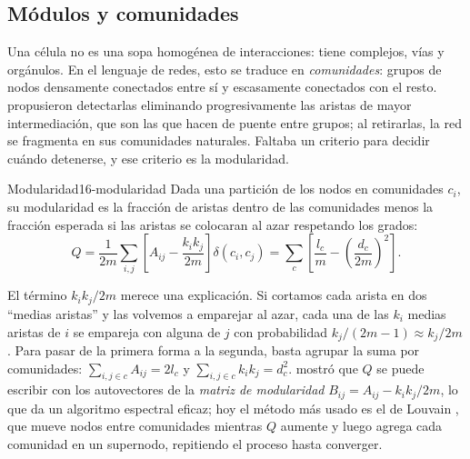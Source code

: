 \subsection{Módulos y comunidades}

Una célula no es una sopa homogénea de interacciones: tiene complejos, vías y orgánulos. En el lenguaje de redes, esto se traduce en \emph{comunidades}: grupos de nodos densamente conectados entre sí y escasamente conectados con el resto. \textcite{c16-girvan2002} propusieron detectarlas eliminando progresivamente las aristas de mayor intermediación, que son las que hacen de puente entre grupos; al retirarlas, la red se fragmenta en sus comunidades naturales. Faltaba un criterio para decidir cuándo detenerse, y ese criterio es la modularidad.

\begin{definicion}{Modularidad}{16-modularidad}
Dada una partición de los nodos en comunidades $c_i$, su modularidad es la fracción de aristas dentro de las comunidades menos la fracción esperada si las aristas se colocaran al azar respetando los grados:
\begin{equation}\label{eq:16-modularidad}
Q=\frac{1}{2m}\sum_{i,j}\left[A_{ij}-\frac{k_ik_j}{2m}\right]\delta(c_i,c_j)
=\sum_{c}\left[\frac{l_c}{m}-\left(\frac{d_c}{2m}\right)^{2}\right].
\end{equation}
\end{definicion}
\begin{simbolos}
\end{simbolos}
El término $k_ik_j/2m$ merece una explicación. Si cortamos cada arista en dos ``medias aristas'' y las volvemos a emparejar al azar, cada una de las $k_i$ medias aristas de $i$ se empareja con alguna de $j$ con probabilidad $k_j/(2m-1)\approx k_j/2m$. Para pasar de la primera forma a la segunda, basta agrupar la suma por comunidades: $\sum_{i,j\in c}A_{ij}=2l_c$ y $\sum_{i,j\in c}k_ik_j=d_c^2$. \textcite{c16-newman2006} mostró que $Q$ se puede escribir con los autovectores de la \emph{matriz de modularidad} $B_{ij}=A_{ij}-k_ik_j/2m$, lo que da un algoritmo espectral eficaz; hoy el método más usado es el de Louvain \parencite{c16-blondel2008}, que mueve nodos entre comunidades mientras $Q$ aumente y luego agrega cada comunidad en un supernodo, repitiendo el proceso hasta converger.

